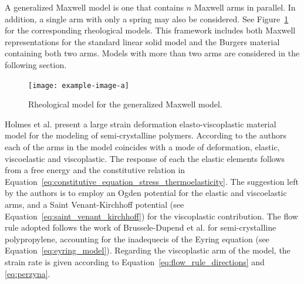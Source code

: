 A generalized Maxwell model is one that contains $n$ Maxwell arms in parallel.
In addition, a single arm with only a spring may also be considered.
See Figure~\ref{fig:rheo_model_gen_maxwell} for the corresponding rheological models.
This framework includes both Maxwell representations for the standard linear solid model and the Burgers material containing both two arms.
Models with more than two arms are considered in the following section.
\begin{figure}[htbp]
	\centering
	\texttt{[image: example-image-a]}
	\caption{Rheological model for the generalized Maxwell model.}
\label{fig:rheo_model_gen_maxwell}
\end{figure}

Holmes et al. \citep{holmesConstitutiveModelLarge2006} present a large strain deformation elasto-viscoplastic material model for the modeling of semi-crystalline polymers.
According to the authors each of the arms in the model coincides with a mode of deformation, elastic, viscoelastic and viscoplastic.
The response of each the elastic elements follows from a free energy and the constitutive relation in Equation~\eqref{eq:constitutive_equation_stress_thermoelasticity}.
The suggestion left by the authors is to employ an Ogden potential for the elastic and viscoelastic arms, and a Saint Venant-Kirchhoff potential (see Equation~\eqref{eq:saint_venant_kirchhoff}) for the viscoplastic contribution.
The flow rule adopted follows the work of
Brussele-Dupend et al. \citep{brusselle-dupendMechanicalBehaviorSemicrystalline2001 ,brusselle-dupendMechanicalBehaviorSemicrystalline2003} for semi-crystalline polypropylene, accounting for the inadequecis of the Eyring equation (see Equation~\eqref{eq:eyring_model}).
Regarding the viscoplastic arm of the model, the strain rate is given according to Equation~\eqref{eq:flow_rule_directions} and \eqref{eq:perzyna}.



